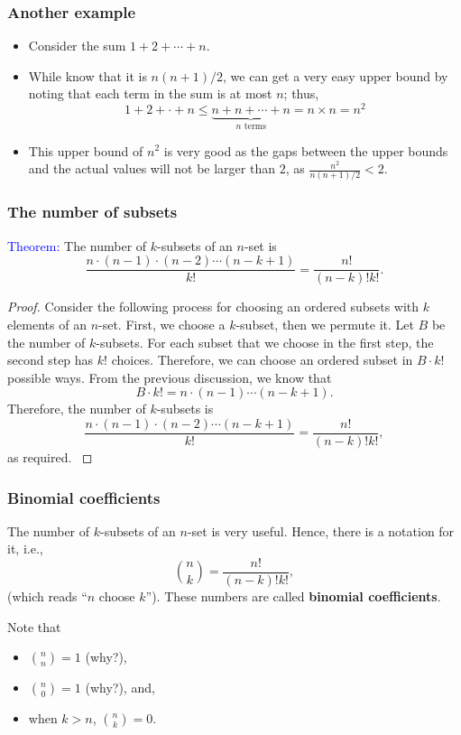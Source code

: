\begin{frame}\frametitle{Another example}
  \begin{itemize}
  \item Consider the sum $1+2+\cdots+n$. \pause
  \item While know that it is $n(n+1)/2$, we can get a very easy upper
    bound by noting that each term in the sum is at most $n$; thus,
    \[ 1+2+\cdot+n\leq \underbrace{n+n+\cdots+n}_{\mbox{$n$ terms}} = n\times n = n^2 \] \pause
  \item This upper bound of $n^2$ is very good as the gaps between the
    upper bounds and the actual values will not be larger than $2$, as
    $\frac{n^2}{n(n+1)/2} < 2$.
  \end{itemize}
\end{frame}

\begin{frame}\frametitle{The number of subsets}
  \begin{tcolorbox}
    \textcolor{blue}{Theorem:}
    The number of $k$-subsets of an $n$-set is
    \[\frac{n\cdot(n-1)\cdot(n-2)\cdots(n-k+1)}{k!}=\frac{n!}{(n-k)!k!}.\]
  \end{tcolorbox}
  
  \begin{proof} {\small
    \pause Consider the following process for choosing an ordered
    subsets with $k$ elements of an $n$-set.  \pause First, we choose
    a $k$-subset, then we permute it.  Let $B$ be the number of
    $k$-subsets.  For each subset that we choose in the first step,
    the second step has $k!$ choices.  \pause Therefore, we can choose
    an ordered subset in $B\cdot k!$ possible ways.  \pause From the
    previous discussion, we know that
    \[
    B\cdot k! = n\cdot(n-1)\cdots(n-k+1).
    \]
    Therefore, the number of $k$-subsets is
    \[\frac{n\cdot(n-1)\cdot(n-2)\cdots(n-k+1)}{k!}=\frac{n!}{(n-k)!k!},\]
    as required.
    }
  \end{proof}
\end{frame}

\begin{frame}\frametitle{Binomial coefficients}
  The number of $k$-subsets of an $n$-set is very useful.  Hence,
  there is a notation for it, i.e.,
  \[
  {n\choose k} = \frac{n!}{(n-k)!k!},
  \]
  (which reads ``$n$ choose $k$'').  These numbers are called {\bf
    binomial coefficients}. \pause

  \vspace{0.1in}
  
  Note that
  \begin{itemize}
  \item ${n\choose n}=1$ (why?), \pause
  \item ${n\choose 0}=1$ (why?), \pause and,
  \item when $k>n$, ${n\choose k}=0$.
  \end{itemize}
\end{frame}

